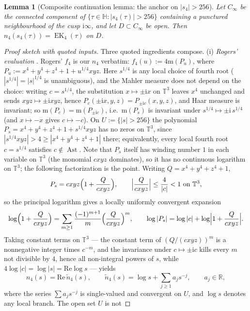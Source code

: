 \documentclass[11pt]{article}
\newcommand{\m}{\mathrm{m}}                 %
\newcommand{\Rr}{\mathbb{R}}
\newcommand{\Hh}{\mathbb{H}}
\newcommand{\Tt}{\mathbb{T}}
\newcommand{\ii}{\mathrm{i}}
\newcommand{\ReT}{\mathrm{Re}}
\DeclareMathOperator{\EK}{EK}
\DeclareMathOperator{\Ast}{Ast}
\newtheorem{lemma}[theorem]{Lemma}
\theoremstyle{definition}
\theoremstyle{remark}
\begin{document}
\begin{lemma}[Composite continuation lemma: the anchor on
$|s_4|>256$]\label{lem:anchor}
Let $C_\infty$ be the connected component of
$\{\tau\in\Hh:|s_4(\tau)|>256\}$ containing a punctured
neighbourhood of the cusp $\ii\infty$, and let $D\subset C_\infty$
be open. Then $n_4(s_4(\tau))=\EK_4(\tau)$ on $D$.
\end{lemma}
\begin{proof}[Proof sketch with quoted inputs]
Three quoted ingredients compose. (i) \emph{Rogers' evaluation}
\cite[Prop.~2.2]{Ro}. Rogers' $f_4$ \cite[\S2]{Ro} is our $n_4$
verbatim: $f_4(u):=4\m(P_u)$, where
$P_u:=x^4+y^4+z^4+1+u^{1/4}xyz$. Here
$s^{1/4}$ is any local choice of fourth root
($|s^{1/4}|=|s|^{1/4}$ is unambiguous), and the Mahler measure
does not depend on the choice: writing $c=s^{1/4}$, the
substitution $x\mapsto\pm\ii x$ on $\Tt^3$ leaves $x^4$ unchanged
and sends $xyz\mapsto\pm\ii xyz$, hence
$P_c(\pm\ii x,y,z)=P_{\pm\ii c}(x,y,z)$, and Haar measure is
invariant; so $\m(P_c)=\m(P_{\pm\ii c})$, i.e.\ $\m(P_s)$ is
invariant under $s^{1/4}\mapsto\pm\ii\,s^{1/4}$ (and
$x\mapsto-x$ gives $c\mapsto-c$). On
$U:=\{|s|>256\}$ the polynomial $P_s=x^4+y^4+z^4+1+s^{1/4}xyz$ has no
zeros on $\Tt^3$, since $|s^{1/4}xyz|>4\ge|x^4+y^4+z^4+1|$ there;
equivalently, every local fourth root $c=s^{1/4}$ satisfies
$c\notin\Ast$. Note that $P_s$ itself has winding number $1$ in each
variable on $\Tt^3$ (the monomial $cxyz$ dominates), so it has no
continuous logarithm on $\Tt^3$; the following factorization is the
point. Writing $Q=x^4+y^4+z^4+1$,
\[
  P_s=cxyz\Bigl(1+\frac{Q}{cxyz}\Bigr),\qquad
  \Bigl|\frac{Q}{cxyz}\Bigr|\le\frac4{|c|}<1\ \text{on }\Tt^3,
\]
so the principal logarithm gives a locally uniformly convergent
expansion
\[
  \log\Bigl(1+\frac{Q}{cxyz}\Bigr)
  =\sum_{m\ge1}\frac{(-1)^{m+1}}m\Bigl(\frac{Q}{cxyz}\Bigr)^m,
  \qquad
  \log|P_s|=\log|c|+\log\Bigl|1+\frac{Q}{cxyz}\Bigr|.
\]
Taking constant terms on $\Tt^3$ --- the constant term of
$(Q/(cxyz))^m$ is a nonnegative integer times $c^{-m}$, and the
invariance under $c\mapsto\pm\ii c$ kills every $m$ not divisible by
$4$, hence all non-integral powers of $s$, while
$4\log|c|=\log|s|=\ReT\log s$ --- yields
\begin{equation}\label{eq:lift4}
n_4(s)=\ReT\,\widetilde n_4(s),\qquad
\widetilde n_4(s)=\log s+\sum_{j\ge1}a_j s^{-j},\qquad a_j\in\Rr,
\end{equation}
where the series $\sum a_js^{-j}$ is single-valued and convergent on
$U$, and $\log s$ denotes any local branch. The open set $U$ is not

\end{proof}
\end{document}
